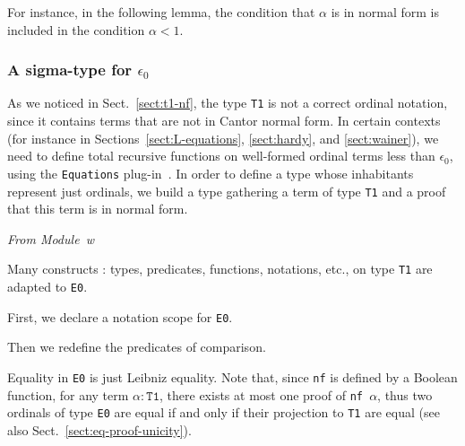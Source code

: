 

\label{Predicates:LT-T1}
 

For instance, in the following lemma, the condition that $\alpha$ is in normal form is included in the condition $\alpha< 1$.




\subsubsection{A sigma-type for \texorpdfstring{$\epsilon_0$}{epsilon0}}

As we noticed in Sect.~\ref{sect:t1-nf}, the type \texttt{T1} is not a correct ordinal notation, since it contains terms that are not in Cantor normal form. In certain contexts (for instance in Sections~\ref{sect:L-equations}, \ref{sect:hardy},
and \ref{sect:wainer}),  we need to define total recursive functions on well-formed ordinal terms less  than $\epsilon_0$, using the \texttt{Equations} plug-in~\cite{sozeau:hal-01671777}.
 In order to define a type whose inhabitants represent just ordinals, we build a type gathering a term of type \texttt{T1} and a proof that this term is in normal form.

 

 

\label{sect:E0-def}
\label{types:E0}

\emph{From Module~w}




Many constructs : types, predicates, functions, notations, etc., on type \texttt{T1} are adapted to \texttt{E0}.

First, we declare a notation scope for \texttt{E0}.





Then we redefine the predicates of comparison.

\label{Predicates:Lt-E0}






Equality in \texttt{E0} is just Leibniz equality. Note that, since \texttt{nf} is
defined by a Boolean function, for  any term $\alpha:\texttt{T1}$, there exists at most one proof of \texttt{nf $\alpha$}, thus two ordinals of type \texttt{E0} are
equal if and only if their projection to \texttt{T1} are equal (see also Sect.~\vref{sect:eq-proof-unicity}).

